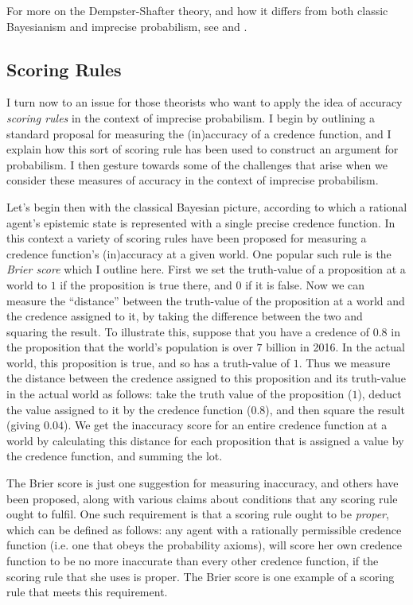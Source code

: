 For more on the Dempster-Shafter theory, and how it differs from both classic Bayesianism and imprecise probabilism, see \citet{halpern2003} and \citet{yagerliu2008}.

\subsection{Scoring Rules}

I turn now to an issue for those theorists who want to apply the idea of accuracy \textit{scoring rules} in the context of imprecise probabilism. I begin by outlining a standard proposal for measuring the (in)accuracy of a credence function, and I explain how this sort of scoring rule has been used to construct an argument for probabilism. I then gesture towards some of the challenges that arise when we consider these measures of accuracy in the context of imprecise probabilism. 

Let's begin then with the classical Bayesian picture, according to which a rational agent's epistemic state is represented with a single precise credence function. In this context  a variety of scoring rules have been proposed for measuring a credence function's (in)accuracy at a given world. One popular such rule is the \textit{Brier score} \citep{brier1950} which I outline here. First we set the truth-value of a proposition at a world to $1$ if the proposition is true there, and $0$  if it is false. Now we can measure the ``distance'' between the truth-value of the proposition at a world and the credence assigned to it, by taking the difference between the two and squaring the result. To illustrate this, suppose that you have a credence of $0.8$ in the proposition  that the world's population is over $7$ billion in 2016. In the actual world, this proposition is true, and so has a truth-value of $1$. Thus we measure the distance between the credence assigned to this proposition and its truth-value in the actual world as follows: take the truth value of the proposition ($1$), deduct the value assigned to it by the credence function ($0.8$),  and then square the result (giving $0.04$). We get the inaccuracy score for an entire credence function at a world by calculating this distance for each proposition that is assigned a value by the credence function, and summing the lot. 

The Brier score is just one suggestion for measuring inaccuracy, and others have been proposed, along with various claims about conditions that any scoring rule ought to fulfil. One such requirement is that a scoring rule ought to be \textit{proper}, which can be defined as follows: any agent with a rationally permissible credence function (i.e. one that obeys the probability axioms), will score her own credence function to be no more inaccurate than every other credence function, if the scoring rule that she uses is proper. The Brier score is one example of a scoring rule that meets this requirement. 

